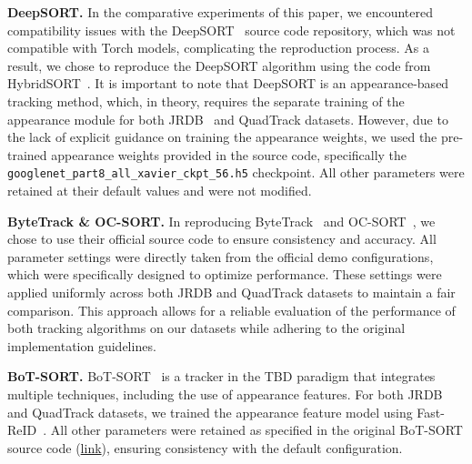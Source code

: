 \noindent\textbf{DeepSORT.} In the comparative experiments of this paper, we encountered compatibility issues with the DeepSORT~\cite{wojke2017simple} source code repository, which was not compatible with Torch models, complicating the reproduction process. 
As a result, we chose to reproduce the DeepSORT algorithm using the code from HybridSORT~\cite{yang2024hybrid}. It is important to note that DeepSORT is an appearance-based tracking method, which, in theory, requires the separate training of the appearance module for both JRDB~\cite{martin2021jrdb} and QuadTrack datasets. 
However, due to the lack of explicit guidance on training the appearance weights, we used the pre-trained appearance weights provided in the source code, specifically the \texttt{googlenet\_part8\_all\_xavier\_ckpt\_56.h5} checkpoint. 
All other parameters were retained at their default values and were not modified.

\noindent\textbf{ByteTrack \& OC-SORT.} 
In reproducing ByteTrack~\cite{zhang2022bytetrack} and OC-SORT~\cite{cao2023observation}, we chose to use their official source code to ensure consistency and accuracy. All parameter settings were directly taken from the official demo configurations, which were specifically designed to optimize performance. These settings were applied uniformly across both JRDB and QuadTrack datasets to maintain a fair comparison. This approach allows for a reliable evaluation of the performance of both tracking algorithms on our datasets while adhering to the original implementation guidelines.

\noindent\textbf{BoT-SORT.} 
BoT-SORT~\cite{aharon2022bot} is a tracker in the TBD paradigm that integrates multiple techniques, including the use of appearance features. 
For both JRDB~\cite{martin2021jrdb} and QuadTrack datasets, we trained the appearance feature model using Fast-ReID~\cite{he2020fastreid}. 
All other parameters were retained as specified in the original BoT-SORT source code (\href{https://github.com/NirAharon/BoT-SORT}{link}), ensuring consistency with the default configuration. 


